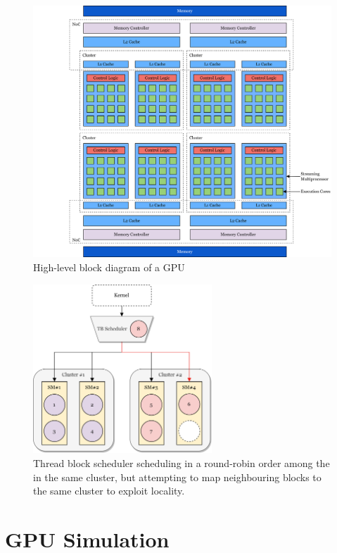 \begin{figure}
    \centering
    \includegraphics[width=1.0\textwidth]{figures/generic-gpu.png}
    \caption{High-level block diagram of a GPU}
    \label{fig:generic-gpu}
\end{figure}

\begin{figure}
    \centering
    \includegraphics[width=0.6\textwidth]{figures/TB_scheduler.png}
    \caption[\acrshort{tb} scheduling]{Thread block scheduler scheduling  in a round-robin order among the  in the same cluster, but attempting to map neighbouring blocks to the same cluster to exploit locality.}
    \label{fig:tb_scheduler}
\end{figure}

\section{GPU Simulation} \label{sec:gpu_simulation}

